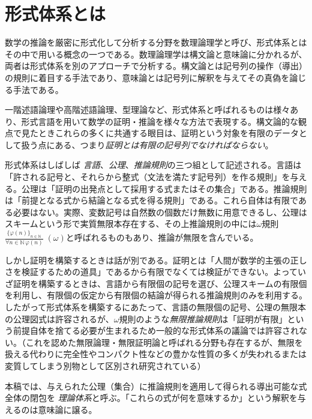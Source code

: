 \documentclass[a4paper,12pt]{bxjsbook}
\newlength{\customindent}
\newenvironment{body}{
  \par
  \begingroup
  \setlength{\leftskip}{\customindent}
  \setlength{\rightskip}{0pt}
  \setlength{\parindent}{1em}
  \setlength{\displayindent}{\customindent}
  \setlength{\displaywidth}{\dimexpr\linewidth-\customindent\relax}
}{
  \par
  \endgroup
}
\theoremstyle{theorem}
\begin{document}
    \section{形式体系とは}

    \begin{body}
        \indent 数学の推論を厳密に形式化して分析する分野を数理論理学と呼び、形式体系とはその中で用いる概念の一つである。数理論理学は構文論と意味論に分かれるが、両者は形式体系を別のアプローチで分析する。構文論とは記号列の操作（導出）の規則に着目する手法であり、意味論とは記号列に解釈を与えてその真偽を論じる手法である。

        \indent 一階述語論理や高階述語論理、型理論など、形式体系と呼ばれるものは様々あり、形式言語を用いて数学の証明・推論を様々な方法で表現する。構文論的な観点で見たときこれらの多くに共通する眼目は、証明という対象を有限のデータとして扱う点にある、つまり\emph{証明とは有限の記号列でなければならない}。
    
        \indent 形式体系はしばしば \emph{言語}、\emph{公理}、\emph{推論規則}の三つ組として記述される。言語は「許される記号と、それらから整式（文法を満たす記号列）を作る規則」を与える。公理は「証明の出発点として採用する式またはその集合」である。推論規則は「前提となる式から結論となる式を得る規則」である。これら自体は有限である必要はない。実際、変数記号は自然数の個数だけ無数に用意できるし、公理はスキームという形で実質無限本存在する、その上推論規則の中には$\omega$規則$\frac{\{\varphi(n)\}_{n\in\mathbb{N}}}{\forall n\in\mathbb{N}\,\varphi(n)}\;(\omega)$と呼ばれるものもあり、推論が無限を含んでいる。

        \indent しかし証明を構築するときは話が別である。証明とは「人間が数学的主張の正しさを検証するための道具」であるから有限でなくては検証ができない。よっていざ証明を構築するときは、言語から有限個の記号を選び、公理スキームの有限個を利用し、有限個の仮定から有限個の結論が得られる推論規則のみを利用する。したがって形式体系を構築するにあたって、言語の無限個の記号、公理の無限本の公理図式は許容されるが、$\omega$規則のような\emph{無限推論規則}は「証明が有限」という前提自体を捨てる必要が生まれるため一般的な形式体系の議論では許容されない。（これを認めた無限論理・無限証明論と呼ばれる分野も存在するが、無限を扱える代わりに完全性やコンパクト性などの豊かな性質の多くが失われるまたは変質してしまう別物として区別され研究されている）
    
        \indent 本稿では、与えられた公理（集合）に推論規則を適用して得られる導出可能な式全体の閉包を \emph{理論体系}と呼ぶ。「これらの式が何を意味するか」という解釈を与えるのは意味論に譲る。
    

\end{body}
\end{document}
